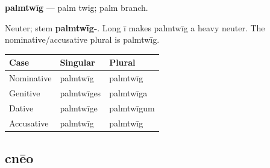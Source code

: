 \par\begin{minipage}{\linewidth}\raggedright
\textbf{palmtwīg} — palm twig; palm branch.

Neuter; stem \textbf{palmtwīg-}. Long ī makes palmtwīg a heavy neuter. The nominative/\allowbreak{}accusative plural is palmtwīg.

\par\begingroup
\fontsize{10.5}{13.2}\selectfont
\setlength{\LTleft}{0pt}\setlength{\LTright}{\fill}
\noindent
\begin{tabular}{@{}>{\raggedright\arraybackslash}p{39.46mm}>{\raggedright\arraybackslash}p{39.46mm}>{\raggedright\arraybackslash}p{39.46mm}@{}}
\toprule
\textbf{Case} & \textbf{Singular} & \textbf{Plural} \\
\midrule
Nominative & palmtwīg & palmtwīg \\
Genitive & palmtwīges & palmtwīga \\
Dative & palmtwīge & palmtwīgum \\
Accusative & palmtwīg & palmtwīg \\
\bottomrule
\end{tabular}
\par\endgroup

\end{minipage}\par
{}
\subsection*{cnēo}

